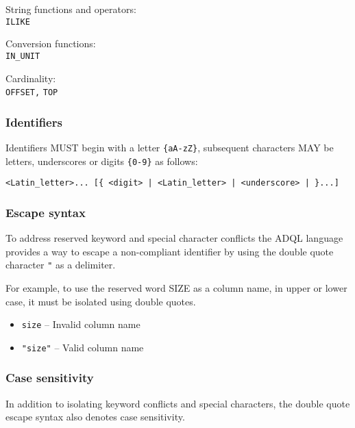 \documentclass[11pt,a4paper]{ivoa}
\begin{document}
\noindent
String functions and operators:\\
\noindent
\texttt{ILIKE}
\newline

\noindent
Conversion functions:\\
\noindent
\texttt{IN\_UNIT}
\newline

\noindent
Cardinality:\\
\noindent
\texttt{OFFSET,} \texttt{TOP}
\newline


\subsubsection{Identifiers}
\label{sec:adql.identifiers}

Identifiers MUST begin with a letter
\verb:{aA-zZ}:, subsequent characters MAY be letters, underscores or
digits \verb:{0-9}: as follows:

\begin{verbatim}
<Latin_letter>... [{ <digit> | <Latin_letter> | <underscore> | }...]
\end{verbatim}

\subsubsection{Escape syntax}
\label{sec:adql.escape}

To address reserved keyword and special character conflicts the ADQL language
provides a way to escape a non-compliant identifier by using the double
quote character \verb:": as a delimiter.

For example, to use the reserved word SIZE as a column name, in upper or lower case,
it must be isolated using double quotes.

\begin{itemize}
    \item \verb:size: -- Invalid column name
    \item \verb:"size": -- Valid column name
\end{itemize}

\subsubsection{Case sensitivity}
\label{sec:adql.case}

In addition to isolating keyword conflicts and special characters,
the double quote escape syntax also denotes case sensitivity.
\end{document}
